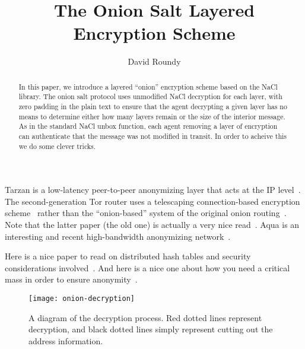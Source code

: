 \documentclass[letterpaper,twocolumn,amsmath,amssymb,pre,aps,10pt]{revtex4-1}
\begin{document}
\title{The Onion Salt Layered Encryption Scheme}
\author{David Roundy}

\begin{abstract}
  In this paper, we introduce a layered ``onion'' encryption scheme
  based on the NaCl library.  The onion salt protocol uses unmodified
  NaCl decryption for each layer, with zero padding in the plain text
  to ensure that the agent decrypting a given layer has no means to
  determine either how many layers remain or the size of the interior
  message.  As in the standard NaCl unbox function, each agent
  removing a layer of encryption can authenticate that the message was
  not modified in transit.  In order to acheive this we do some clever
  tricks.
\end{abstract}

\maketitle

Tarzan is a low-latency peer-to-peer anonymizing layer that acts at
the IP level~\cite{freedman2002tarzan}.  The second-generation Tor
router uses a telescaping connection-based encryption
scheme~\cite{dingledine2004tor} rather than the ``onion-based'' system
of the original onion routing~\cite{reed1998onionrouting}.  Note that
the latter paper (the old one) is actually a very nice
read~\cite{reed1998onionrouting}.  Aqua is an interesting and recent
high-bandwidth anonymizing network~\cite{leblond2013towards}.

Here is a nice paper to read on distributed hash tables and security
considerations involved~\cite{sit2002security}.  And here is a nice
one about how you need a critical mass in order to ensure
anonymity~\cite{dingledine2006anonymity}.

\begin{figure*}
  \begin{center}
    \texttt{[image: onion-decryption]}
  \end{center}
  \caption{A diagram of the decryption process.  Red dotted lines
    represent decryption, and black dotted lines simply represent
    cutting out the address information.}
\end{figure*}

\end{document}
